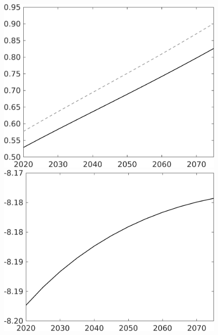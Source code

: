 \documentclass[12pt]{article}
\begin{document}
\begin{figure}[h!!]
\begin{minipage}[]{0.32\textwidth}
\end{minipage}	
	\begin{minipage}[]{0.32\textwidth}
		\includegraphics[width=1\textwidth]{../../codding_model/own_basedOnFried/optimalPol_010922_revision/figures/all_13Sept22/CompTaul_Equlab_LFBAU_Reg0_C_spillover0_nsk0_xgr0_knspil1_sep1_countec0_GovRev0_etaa0.79_lgd0.png}
	\end{minipage}	
\begin{minipage}[]{0.32\textwidth}
	\includegraphics[width=1\textwidth]{../../codding_model/own_basedOnFried/optimalPol_010922_revision/figures/all_13Sept22/CompTaul_Equlab_LFBAUPer_Reg0_F_spillover0_nsk0_xgr0_knspil1_sep1_countec0_GovRev0_etaa0.79.png}

\end{minipage}
\end{figure}
\end{document}
